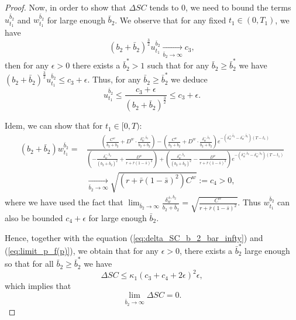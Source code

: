 \documentclass[11pt]{article}
\begin{document}
\begin{proof}
 	
 	Now, in order to show that $\Delta SC$ tends to $0$, we need to bound the terms $u_{t_1}^{\bar{b}_2}$ and $w_{t_1}^{\bar{b}_2}$ for large enough $\bar{b}_2$. We observe that for any fixed $t_1 \in (0,T_1)$, we have
 	$$ (b_2 + \bar{b}_2)^{\frac{3}{2}} u_{t_1}^{\bar{b}_2} \xrightarrow[\bar{b}_2 \to \infty]{} c_3, $$
 	then for any $\epsilon >0$ there exists a $\bar{b}_2^* > 1$ such that for any $\bar{b}_2 \geq \bar{b}_2^*$ we have $ (b_2 + \bar{b}_2)^{\frac{3}{2}} u_{t_1}^{\bar{b}_2} \leq c_3 + \epsilon$. Thus, for any $\bar{b}_2 \geq \bar{b}_2^*$ we deduce
 	$$ u_{t_1}^{\bar{b}_2} \leq \frac{c_3 + \epsilon}{(b_2 + \bar{b}_2)^{\frac{3}{2}} } \leq c_3 + \epsilon.
 	$$
 		
 	Idem, we can show that for $t_1 \in [0,T)$:
	\begin{equation*}
	\begin{split}
	(b_2 + \bar{b}_2) w^{\bar{b}_2}_{t_1} =&\frac{ \left( \frac{C^{w}}{b_2 + \bar{b}_2} + D^{w}\cdot \frac{\delta^{+,\bar{b}_2}_w}{b_2 + \bar{b}_2}  \right) - \left( \frac{C^{w}}{b_2 + \bar{b}_2} + D^{w}\cdot \frac{\delta^{-,\bar{b}_2}_w}{b_2 + \bar{b}_2}  \right) e^{- (\delta^{+,\bar{b}_2}_w - \delta^{-,\bar{b}_2}_w)(T- t_1)}}{ \left(- \frac{\delta^{-,\bar{b}_2}_w}{(b_2 + \bar{b}_2)^2} + \frac{D^{w}}{r + \bar{r}(1-\bar{s})^2} \right) + \left( \frac{\delta^{+,\bar{b}_2}_w}{(b_2 + \bar{b}_2)^2} - \frac{D^{w}}{r + \bar{r}(1-\bar{s})^2} \right)e^{- (\delta^{+,\bar{b}_2}_w - \delta^{-,\bar{b}_2}_w)(T-t_1)} }\\
	&\xrightarrow[\bar{b}_2 \to \infty]{} \sqrt{(r + \bar{r}(1-\bar{s})^2) C^w} := c_4 >0,
	\end{split}
	\end{equation*}
	where we have used the fact that $\lim_{\bar{b}_2 \to \infty}\frac{\delta^{\pm,\bar{b}_2}_w}{b_2 + \bar{b}_2}=\sqrt{\frac{C^w}{r+\bar{r}(1-\bar{s})^2}}$. Thus $w_{t_1}^{\bar{b}_2}$ can also be bounded $c_4 + \epsilon$ for large enough $\bar{b}_2$.
	
	Hence, together with the equation (\ref{eq:delta_SC_b_2_bar_infty}) and  (\ref{eq:limit_p_f(p)}), we obtain that for any $\epsilon > 0$, there exists a $\bar{b}_2^*$ large enough so that for all $\bar{b}_2 \geq \bar{b}_2^*$ we have
	$$ \Delta SC \leq \kappa_1 (c_3 + c_4 + 2 \epsilon)^2 \epsilon,$$
	which implies that 
	$$\lim_{\bar{b}_2 \to \infty} \Delta SC = 0.$$
	

\end{proof}
\end{document}
